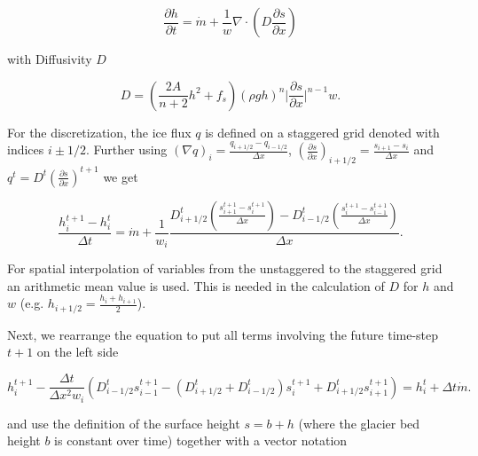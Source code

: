\documentclass[journal abbreviation, manuscript]{copernicus}
\begin{document}
\begin{equation}\label{eqn:dh/dt}
    \frac{\partial h}{\partial t} = \Dot{m} + \frac{1}{w} \nabla \cdot (D\frac{\partial s}{\partial x})
\end{equation}

\noindent with Diffusivity $D$

\begin{equation}
    D = \left(\frac{2 A}{n + 2} h^2 + f_s \right) (\rho g h)^n \lvert \frac{\partial s}{\partial x} \rvert^{n - 1} w.
\end{equation}

For the discretization, the ice flux $q$ is defined on a staggered grid denoted with indices $i \pm 1/2$. Further using $(\nabla q)_i = \frac{q_{i+1/2} - q_{i-1/2}}{\Delta x}$, $\left(\frac{\partial s}{\partial x}\right)_{i+1/2} = \frac{s_{i+1} - s_i}{\Delta x}$ and $q^t = D^t \left(\frac{\partial s}{\partial x}\right)^{t+1}$ we get

\begin{equation}
    \frac{h_{i}^{t+1} - h_{i}^{t}}{\Delta t} = \Dot{m} + \frac{1}{w_i}\frac{D_{i+1/2}^{t} \left(\frac{s_{i+1}^{t+1} - s_{i}^{t+1}}{\Delta x}\right) - D_{i-1/2}^{t} \left(\frac{s_{i}^{t+1} - s_{i-1}^{t+1}}{\Delta x}\right)}{\Delta x}.
\end{equation}

\noindent For spatial interpolation of variables from the unstaggered to the staggered grid an arithmetic mean value is used. This is needed in the calculation of $D$ for $h$ and $w$  (e.g. $h_{i+1/2} = \frac{h_i + h_{i+1}}{2}$).

Next, we rearrange the equation to put all terms involving the future time-step $t+1$ on the left side

\begin{equation}
    h_{i}^{t+1} -  \frac{\Delta t}{\Delta x^2 w_i}\left(D_{i-1/2}^{t} s_{i-1}^{t+1} - (D_{i+1/2}^{t} + D_{i-1/2}^{t}) s_{i}^{t+1} + D_{i+1/2}^{t} s_{i+1}^{t+1}\right) = h_{i}^{t} + \Delta t \Dot{m}.
\end{equation}

\noindent and use the definition of the surface height $s=b+h$ (where the glacier bed height $b$ is constant over time) together with a vector notation
\end{document}

